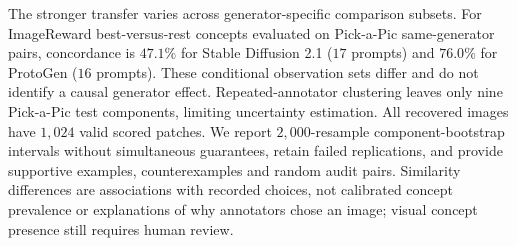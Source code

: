 The stronger transfer varies across generator-specific comparison subsets. For ImageReward best-versus-rest concepts evaluated on Pick-a-Pic same-generator pairs, concordance is $47.1\%$ for Stable Diffusion 2.1 ($17$ prompts) and $76.0\%$ for ProtoGen ($16$ prompts). These conditional observation sets differ and do not identify a causal generator effect. Repeated-annotator clustering leaves only nine Pick-a-Pic test components, limiting uncertainty estimation. All recovered images have $1{,}024$ valid scored patches. We report $2{,}000$-resample component-bootstrap intervals without simultaneous guarantees, retain failed replications, and provide supportive examples, counterexamples and random audit pairs. Similarity differences are associations with recorded choices, not calibrated concept prevalence or explanations of why annotators chose an image; visual concept presence still requires human review.
